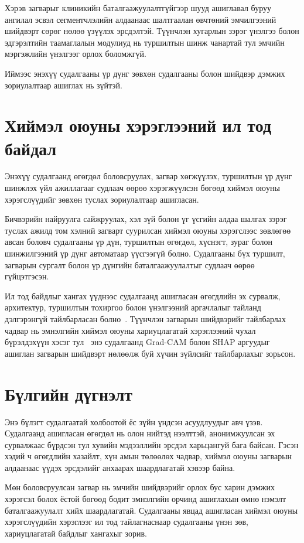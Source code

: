 Хэрэв загварыг клиникийн баталгаажуулалтгүйгээр шууд ашиглавал буруу ангилал эсвэл сегментчлэлийн алдаанаас шалтгаалан өвчтөний эмчилгээний шийдвэрт сөрөг нөлөө үзүүлэх эрсдэлтэй. Түүнчлэн хугарлын зэрэг үнэлгээ болон эдгэрэлтийн таамаглалын модулиуд нь туршилтын шинж чанартай тул эмчийн мэргэжлийн үнэлгээг орлох боломжгүй.

Иймээс энэхүү судалгааны үр дүнг зөвхөн судалгааны болон шийдвэр дэмжих зориулалтаар ашиглах нь зүйтэй.

\section{Хиймэл оюуны хэрэглээний ил тод байдал}

Энэхүү судалгаанд өгөгдөл боловсруулах, загвар хөгжүүлэх, туршилтын үр дүнг шинжлэх үйл ажиллагааг судлаач өөрөө хэрэгжүүлсэн бөгөөд хиймэл оюуны хэрэгслүүдийг зөвхөн туслах зориулалтаар ашигласан.

Бичвэрийн найруулга сайжруулах, хэл зүй болон үг үсгийн алдаа шалгах зэрэг туслах ажилд том хэлний загварт суурилсан хиймэл оюуны хэрэгслээс зөвлөгөө авсан боловч судалгааны үр дүн, туршилтын өгөгдөл, хүснэгт, зураг болон шинжилгээний үр дүнг автоматаар үүсгээгүй болно. Судалгааны бүх туршилт, загварын сургалт болон үр дүнгийн баталгаажуулалтыг судлаач өөрөө гүйцэтгэсэн.

Ил тод байдлыг хангах үүднээс судалгаанд ашигласан өгөгдлийн эх сурвалж, архитектур, туршилтын тохиргоо болон үнэлгээний аргачлалыг тайланд дэлгэрэнгүй тайлбарласан болно~\cite{ref51}. Түүнчлэн загварын шийдвэрийг тайлбарлах чадвар нь эмнэлгийн хиймэл оюуны хариуцлагатай хэрэглээний чухал бүрэлдэхүүн хэсэг тул~\cite{ref50} энэ судалгаанд Grad-CAM болон SHAP аргуудыг ашиглан загварын шийдвэрт нөлөөлж буй хүчин зүйлсийг тайлбарлахыг зорьсон.

\section{Бүлгийн дүгнэлт}

Энэ бүлэгт судалгаатай холбоотой ёс зүйн үндсэн асуудлуудыг авч үзэв. Судалгаанд ашигласан өгөгдөл нь олон нийтэд нээлттэй, анонимжуулсан эх сурвалжаас бүрдсэн тул хувийн мэдээллийн эрсдэл харьцангуй бага байсан. Гэсэн хэдий ч өгөгдлийн хазайлт, хүн амын төлөөлөх чадвар, хиймэл оюуны загварын алдаанаас үүдэх эрсдэлийг анхаарах шаардлагатай хэвээр байна.

Мөн боловсруулсан загвар нь эмчийн шийдвэрийг орлох бус харин дэмжих хэрэгсэл болох ёстой бөгөөд бодит эмнэлгийн орчинд ашиглахын өмнө нэмэлт баталгаажуулалт хийх шаардлагатай. Судалгааны явцад ашигласан хиймэл оюуны хэрэгслүүдийн хэрэглээг ил тод тайлагнаснаар судалгааны үнэн зөв, хариуцлагатай байдлыг хангахыг зорив.
